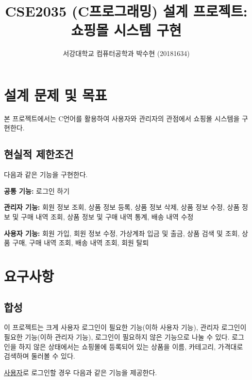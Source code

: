 \documentclass[runningheads]{llncs}
\begin{document}
\title{CSE2035 (C프로그래밍) \space \newline 설계 프로젝트: 쇼핑몰 시스템 구현}
\author{서강대학교 컴퓨터공학과 박수현 (20181634)}
\maketitle

\section{설계 문제 및 목표}
본 프로젝트에서는 C언어를 활용하여 사용자와 관리자의 관점에서 쇼핑몰 시스템을 구현한다.

\subsection{현실적 제한조건}
다음과 같은 기능을 구현한다.

\textbf{공통 기능:} 로그인 하기

\textbf{관리자 기능:} 회원 정보 조회,
상품 정보 등록,
상품 정보 삭제,
상품 정보 수정,
상품 정보 및 구매 내역 조회,
상품 정보 및 구매 내역 통계,
배송 내역 수정

\textbf{사용자 기능:} 회원 가입,
회원 정보 수정,
가상계좌 입금 및 출금,
상품 검색 및 조회,
상품 구매,
구매 내역 조회,
배송 내역 조회,
회원 탈퇴

%
%
%

\section{요구사항}

\subsection{합성}
이 프로젝트는 크게 사용자 로그인이 필요한 기능(이하 사용자 기능), 관리자 로그인이 필요한 기능(이하 관리자 기능), 로그인이 필요하지 않은 기능으로 나눌 수 있다. 로그인을 하지 않은 상태에서는 쇼핑몰에 등록되어 있는 상품을 이름, 카테고리, 가격대로 검색하며 둘러볼 수 있다.

\underline{사용자}로 로그인할 경우 다음과 같은 기능을 제공한다.
\end{document}
